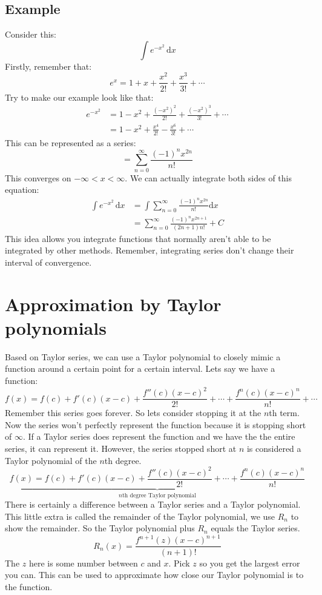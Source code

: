 \documentclass{report}
\begin{document}
    \subsection{Example}
        Consider this:
        \[\int e^{-x^2} \,\mathrm{d}x \]
        Firstly, remember that:
        \[e^x = 1 + x + \frac{x^2}{2!} + \frac{x^3}{3!} + \cdots\]
        Try to make our example look like that:
        \begin{align*}
            e^{-x^2} &= 1 - x^2 + \frac{(-x^2)^2}{2!} + \frac{(-x^2)^3}{3!} + \cdots \\
            &= 1 - x^2 + \frac{x^4}{2!} - \frac{x^6}{3!} + \cdots
        \end{align*}
        This can be represented as a series:
        \[= \sum_{n=0}^{\infty} \frac{(-1)^n x^{2n}}{n!}\]
        This converges on \(- \infty < x < \infty\).
        We can actually integrate both sides of this equation:
        \begin{align*}
            \int e^{-x^2} \,\mathrm{d}x &= \int \sum_{n=0}^{\infty} \frac{(-1)^n x^{2n}}{n!} \mathrm{d}x \\
            &= \sum_{n=0}^{\infty} \frac{(-1)^n x^{2n+1}}{(2n+1)n!} + C
        \end{align*}
        This idea allows you integrate functions that normally aren't able to be integrated by other methods.
        Remember, integrating series don't change their interval of convergence.

\newpage
\section{Approximation by Taylor polynomials}
    Based on Taylor series, we can use a Taylor polynomial to closely mimic a function around a certain point for a certain interval.
    Lets say we have a function:
    \[f(x) = f(c) + f'(c)(x-c) + \frac{f''(c)(x-c)^2}{2!} + \cdots + \frac{f^n(c)(x-c)^n}{n!} + \cdots\]
    Remember this series goes forever. So lets consider stopping it at the \(n\)th term.
    Now the series won't perfectly represent the function because it is stopping short of \(\infty\).
    If a Taylor series does represent the function and we have the the entire series, it can represent it.
    However, the series stopped short at \(n\) is considered a Taylor polynomial of the \(n\)th degree.
    \[\underbrace{f(x) = f(c) + f'(c)(x-c) + \frac{f''(c)(x-c)^2}{2!} + \cdots + \frac{f^n(c)(x-c)^n}{n!}}_{n \text{th degree Taylor polynomial}}\]
    There is certainly a difference between a Taylor series and a Taylor polynomial.
    This little extra is called the remainder of the Taylor polynomial, we use \(R_n\) to show the remainder.
    So the Taylor polynomial plus \(R_n\) equals the Taylor series.
    \[R_n(x) = \frac{f^{n+1}(z)(x-c)^{n+1}}{(n+1)!} \]
    The \(z\) here is some number between \(c\) and \(x\).
    Pick \(z\) so you get the largest error you can.
    This can be used to approximate how close our Taylor polynomial is to the function.
    
\end{document}
